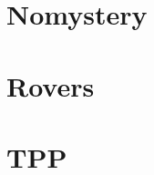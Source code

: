 \documentclass[12pt]{article}
\begin{document}
\section{Nomystery}



\newpage
\section{Rovers}




\newpage
\section{TPP}




%
%

%

%
%
\end{document}
